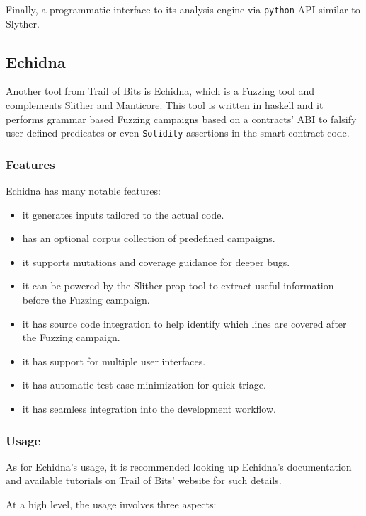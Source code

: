 Finally, a programmatic interface to its analysis engine via
\texttt{python} API similar to Slyther.

\subsection{Echidna}\label{echidna}

Another tool from Trail of Bits is Echidna, which is a Fuzzing tool and
complements Slither and Manticore. This tool is written in haskell and
it performs grammar based Fuzzing campaigns based on a contracts' ABI to
falsify user defined predicates or even \texttt{Solidity} assertions in
the smart contract code.

\subsubsection{Features}\label{features-1}

Echidna has many notable features:

\begin{itemize}
\tightlist
\item
  it generates inputs tailored to the actual code.
\item
  has an optional corpus collection of predefined campaigns.
\item
  it supports mutations and coverage guidance for deeper bugs.
\item
  it can be powered by the Slither prop tool to extract useful
  information before the Fuzzing campaign.
\item
  it has source code integration to help identify which lines are
  covered after the Fuzzing campaign.
\item
  it has support for multiple user interfaces.
\item
  it has automatic test case minimization for quick triage.
\item
  it has seamless integration into the development workflow.
\end{itemize}

\subsubsection{Usage}\label{usage}

As for Echidna's usage, it is recommended looking up Echidna's
documentation and available tutorials on Trail of Bits' website for such
details.

At a high level, the usage involves three aspects:

